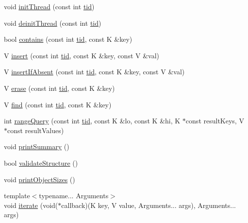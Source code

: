 \begin{DoxyCompactItemize}
\item 
void \hyperlink{classds__adapter_a3733f6a6b57312b1b5e4fb5181d82a0b}{init\+Thread} (const int \hyperlink{microbench_2main_8cpp_a9ca9869868fe7e7a38a921cc7de4103f}{tid})
\item 
void \hyperlink{classds__adapter_a173ca48b19fc1dc346159ea582c690cd}{deinit\+Thread} (const int \hyperlink{microbench_2main_8cpp_a9ca9869868fe7e7a38a921cc7de4103f}{tid})
\item 
bool \hyperlink{classds__adapter_aecf1899dbe9fae93c72ee2b5549cf6eb}{contains} (const int \hyperlink{microbench_2main_8cpp_a9ca9869868fe7e7a38a921cc7de4103f}{tid}, const K \&key)
\item 
V \hyperlink{classds__adapter_a6c0fc676d77e30e14946baf325174739}{insert} (const int \hyperlink{microbench_2main_8cpp_a9ca9869868fe7e7a38a921cc7de4103f}{tid}, const K \&key, const V \&val)
\item 
V \hyperlink{classds__adapter_ae9cb29ad0c0338c0e1d12ef97e008135}{insert\+If\+Absent} (const int \hyperlink{microbench_2main_8cpp_a9ca9869868fe7e7a38a921cc7de4103f}{tid}, const K \&key, const V \&val)
\item 
V \hyperlink{classds__adapter_a1bf459e8449df93cc738a644aeffdcfb}{erase} (const int \hyperlink{microbench_2main_8cpp_a9ca9869868fe7e7a38a921cc7de4103f}{tid}, const K \&key)
\item 
V \hyperlink{classds__adapter_a0109b0d011810f687c9e9273eb1d1bc8}{find} (const int \hyperlink{microbench_2main_8cpp_a9ca9869868fe7e7a38a921cc7de4103f}{tid}, const K \&key)
\item 
int \hyperlink{classds__adapter_a23a9c8db5425e98a93d647df1c6c23dd}{range\+Query} (const int \hyperlink{microbench_2main_8cpp_a9ca9869868fe7e7a38a921cc7de4103f}{tid}, const K \&lo, const K \&hi, K $\ast$const result\+Keys, V $\ast$const result\+Values)
\item 
void \hyperlink{classds__adapter_aac97293215557665d2ef1e1a0d06fcfd}{print\+Summary} ()
\item 
bool \hyperlink{classds__adapter_ae50fe8a8683c0278cdd4c45e1405860d}{validate\+Structure} ()
\item 
void \hyperlink{classds__adapter_a33b13b7059a8c0345fb59a324dc3a691}{print\+Object\+Sizes} ()
\item 
{\footnotesize template$<$typename... Arguments$>$ }\\void \hyperlink{classds__adapter_ab1e0bb9a9b403ba68e85bf53219b1368}{iterate} (void($\ast$callback)(K key, V value, Arguments... args), Arguments... args)
\item 

\end{DoxyCompactItemize}
